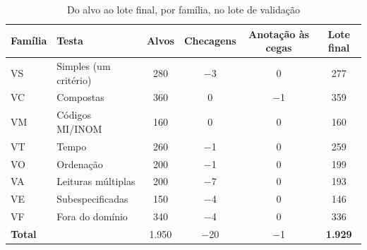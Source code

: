\begin{table}[htbp!]
\centering
\caption{Do alvo ao lote final, por família, no lote de validação}
\label{tab:lote_composicao}
\footnotesize
\begin{tabular}{|l|l|c|c|c|c|}
\hline
\textbf{Família} & \textbf{Testa} & \textbf{Alvos} & \textbf{Checagens} & \textbf{Anotação às cegas} & \textbf{Lote final} \\
\hline
VS & Simples (um critério) & 280 & $-$3 & 0 & 277 \\
VC & Compostas & 360 & 0 & $-$1 & 359 \\
VM & Códigos MI/INOM & 160 & 0 & 0 & 160 \\
VT & Tempo & 260 & $-$1 & 0 & 259 \\
VO & Ordenação & 200 & $-$1 & 0 & 199 \\
VA & Leituras múltiplas & 200 & $-$7 & 0 & 193 \\
VE & Subespecificadas & 150 & $-$4 & 0 & 146 \\
VF & Fora do domínio & 340 & $-$4 & 0 & 336 \\
\hline
\textbf{Total} & & 1.950 & $-$20 & $-$1 & \textbf{1.929} \\
\hline
\end{tabular}
\end{table}
